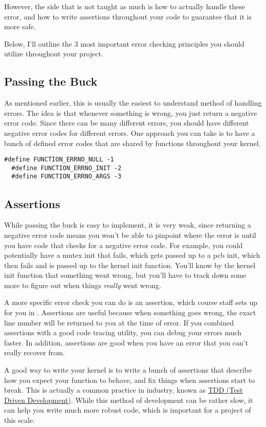 \documentclass{article}
\begin{document}
However, the side that is not taught as much is how to actually handle these
error, and how to write assertions throughout your code to guarantee 
that it is more safe. 

Below, I'll outline the 3 most important error checking principles you should
utilize throughout your project.

\subsection{Passing the Buck}
As mentioned earlier, this is usually the easiest to understand method of handling
errors. The idea is that whenever something is wrong, you just return a negative error code.
Since there can be many different errors, you should have different negative error codes
for different errors. One approach you can take is to have a bunch of defined
error codes that are shared by functions throughout your kernel.

\begin{lstlisting}[caption={Negative error code defines}]
  #define FUNCTION_ERRNO_NULL -1
  #define FUNCTION_ERRNO_INIT -2
  #define FUNCTION_ERRNO_ARGS -3
\end{lstlisting}

\subsection{Assertions}
While passing the buck is easy to implement, it is very weak, since returning a negative error code means you won't
be able to pinpoint where the error is until you have code that checks for a negative error code.
For example, you could potentially have a mutex init that fails, which gets passed up to a pcb init,
which then fails and is passed up to the kernel init function. You'll know by the kernel init 
function that something went wrong, but you'll have to track down some more to figure out when things
\textit{really} went wrong.

A more specific error check you can do is an assertion, which course staff sets 
up for you in . Assertions are useful because when something goes wrong,
the exact line number will be returned to you at the time of error. If you combined
assertions with a good code tracing utility, you can debug your errors much faster.
In addition, assertions are good when you have an error that you can't really recover from.

A good way to write your kernel is to write a bunch of assertions that 
describe how you expect your function to behave, and fix things when
assertions start to break. This is actually a common practice in industry, 
known as 
\href{https://en.wikipedia.org/wiki/Test-driven_development}{TDD (Test Driven Development)}.
While this method of development can be rather slow, it can help you write much more
robust code, which is important for a project of this scale.
\end{document}
